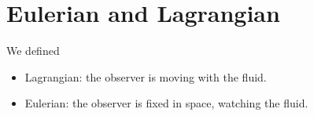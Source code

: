 \section{Eulerian and Lagrangian}
%
We defined

\begin{itemize}
\item Lagrangian: the observer is moving with the fluid.
\item Eulerian: the observer is fixed in space, watching the fluid.
\end{itemize}
